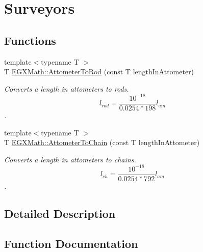 \hypertarget{group___e_g_x_math-_conversions-_length_conversions-_attometer-_surveyors}{}\section{Surveyors}
\label{group___e_g_x_math-_conversions-_length_conversions-_attometer-_surveyors}
\subsection*{Functions}
\begin{DoxyCompactItemize}
\item 
{\footnotesize template$<$typename T $>$ }\\T \mbox{\hyperlink{group___e_g_x_math-_conversions-_length_conversions-_attometer-_surveyors_ga4bdcb3e42e19c5f1ca38ee513654dfa4}{E\+G\+X\+Math\+::\+Attometer\+To\+Rod}} (const T length\+In\+Attometer)
\begin{DoxyCompactList}\small\item\em Converts a length in attometers to rods. \[ l_{rod}= \frac{10^{-18}}{0.0254 * 198} l_{am} \]. \end{DoxyCompactList}\item 
{\footnotesize template$<$typename T $>$ }\\T \mbox{\hyperlink{group___e_g_x_math-_conversions-_length_conversions-_attometer-_surveyors_gab0d950b7446370314d85395a073f2e73}{E\+G\+X\+Math\+::\+Attometer\+To\+Chain}} (const T length\+In\+Attometer)
\begin{DoxyCompactList}\small\item\em Converts a length in attometers to chains. \[ l_{ch}= \frac{10^{-18}}{0.0254 * 792} l_{am} \]. \end{DoxyCompactList}\end{DoxyCompactItemize}


\subsection{Detailed Description}


\subsection{Function Documentation}
\mbox{\label{group___e_g_x_math-_conversions-_length_conversions-_attometer-_surveyors_gab0d950b7446370314d85395a073f2e73}} 
